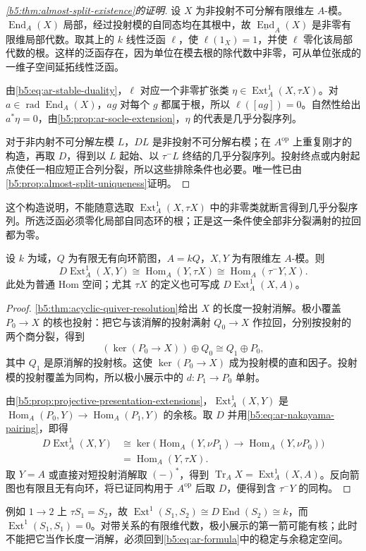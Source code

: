 \begin{proof}[\cref{b5:thm:almost-split-existence}的证明]
	设 \(X\) 为非投射不可分解有限维左 \(A\)-模。\(\operatorname{End}_A(X)\) 局部，经过投射模的自同态均在其根中，故 \(\underline{\operatorname{End}}_A(X)\) 是非零有限维局部代数。取其上的 \(k\) 线性泛函 \(\ell\)，使 \(\ell(1_X)=1\)，并使 \(\ell\) 零化该局部代数的根。这样的泛函存在，因为单位在模去根的除代数中非零，可从单位张成的一维子空间延拓线性泛函。

	由\eqref{b5:eq:ar-stable-duality}，\(\ell\) 对应一个非零扩张类 \(\eta\in\operatorname{Ext}_A^1(X,\tau X)\)。对 \(a\in\operatorname{rad}\operatorname{End}_A(X)\)，\(ag\) 对每个 \(g\) 都属于根，所以 \(\ell([ag])=0\)。自然性给出 \(a^*\eta=0\)，由\cref{b5:prop:ar-socle-extension}，\(\eta\) 的代表是几乎分裂序列。

	对于非内射不可分解左模 \(L\)，\(DL\) 是非投射不可分解右模；在 \(A^{\mathrm{op}}\) 上重复刚才的构造，再取 \(D\)，得到以 \(L\) 起始、以 \(\tau^-L\) 终结的几乎分裂序列。投射终点或内射起点使任一相应短正合列分裂，所以这些排除条件也必要。唯一性已由\cref{b5:prop:almost-split-uniqueness}证明。
\end{proof}

这个构造说明，不能随意选取 \(\operatorname{Ext}_A^1(X,\tau X)\) 中的非零类就断言得到几乎分裂序列。所选泛函必须零化局部自同态环的根；正是这一条件使全部非分裂满射的拉回都为零。

\begin{corollary}\label{b5:cor:ar-hereditary-formula}
	设 \(k\) 为域，\(Q\) 为有限无有向环箭图，\(A=kQ\)，\(X,Y\) 为有限维左 \(A\)-模。则
	\[
		D\operatorname{Ext}_A^1(X,Y)
		\cong\operatorname{Hom}_A(Y,\tau X)
		\cong\operatorname{Hom}_A(\tau^-Y,X).
	\]
	此处为普通 Hom 空间；尤其 \(\tau X\) 的定义也可写成 \(D\operatorname{Ext}_A^1(X,A)\)。
\end{corollary}
\begin{proof}
	\cref{b5:thm:acyclic-quiver-resolution}给出 \(X\) 的长度一投射消解。极小覆盖 \(P_0\to X\) 的核也投射：把它与该消解的投射满射 \(Q_0\to X\) 作拉回，分别按投射的两个商分裂，得到
	\[
		(\ker(P_0\to X))\oplus Q_0\cong Q_1\oplus P_0,
	\]
	其中 \(Q_1\) 是原消解的投射核。这使 \(\ker(P_0\to X)\) 成为投射模的直和因子。投射模的投射覆盖为同构，所以极小展示中的 \(d:P_1\to P_0\) 单射。

	由\cref{b5:prop:projective-presentation-extensions}，\(\operatorname{Ext}_A^1(X,Y)\) 是 \(\operatorname{Hom}_A(P_0,Y)\to\operatorname{Hom}_A(P_1,Y)\) 的余核。取 \(D\) 并用\eqref{b5:eq:ar-nakayama-pairing}，即得
	\[
		\begin{aligned}
		D\operatorname{Ext}_A^1(X,Y)
		&\cong\ker\bigl(\operatorname{Hom}_A(Y,\nu P_1)
		\to\operatorname{Hom}_A(Y,\nu P_0)\bigr)\\
		&=\operatorname{Hom}_A(Y,\tau X).
		\end{aligned}
	\]
	取 \(Y=A\) 或直接对短投射消解取 \((-)^*\)，得到 \(\operatorname{Tr}_A X=\operatorname{Ext}_A^1(X,A)\)。反向箭图也有限且无有向环，将已证同构用于 \(A^{\mathrm{op}}\) 后取 \(D\)，便得到含 \(\tau^-Y\) 的同构。
\end{proof}

例如 \(1\to2\) 上 \(\tau S_1=S_2\)，故 \(\operatorname{Ext}^1(S_1,S_2)\cong D\operatorname{End}(S_2)\cong k\)，而 \(\operatorname{Ext}^1(S_1,S_1)=0\)。对带关系的有限维代数，极小展示的第一箭可能有核；此时不能把它当作长度一消解，必须回到\eqref{b5:eq:ar-formula}中的稳定与余稳定空间。
